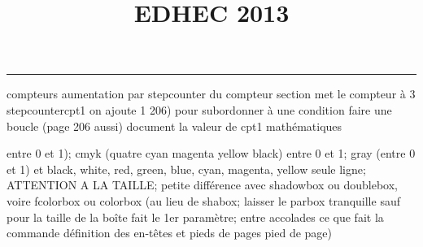 \documentclass[11pt]{article}%
\title{\bf \vspace{-2cm} EDHEC 2013} %
\author{} %
\date{} %
\renewcommand{\headrulewidth}{0pt}%
\renewcommand{\footrulewidth}{0.4pt}%
\begin{document}
\maketitle %
\vspace{-1.4cm}\hrule %
\thispagestyle{fancy}

\vspace*{.2cm}



compteurs%
aumentation par stepcounter du compteur section%
met le compteur à 3%
stepcounter{cpt1} on ajoute 1%
206) pour subordonner à une condition %
faire une boucle (page 206 aussi) %
document la valeur de cpt1 
mathématiques\newcommand{\ch}{\operatorname{ch}} 
\newcommand{\sh}{\operatorname{sh}}
\renewcommand{\tanh}{\operatorname{th}}
\renewcommand{\sinh}{\operatorname{sh}}
\renewcommand{\cosh}{\operatorname{ch}}
\newcommand{\argsh}{\operatorname{argsh}}
\newcommand{\argch}{\operatorname{argch}}
\newcommand{\argth}{\operatorname{argth}}
\newcommand{\Id}{\operatorname{Id}}
\newcommand{\id}{\operatorname{id}}
\renewcommand{\im}{\operatorname{Im}}
\renewcommand{\leq}{\leq}
\renewcommand{\geq}{\geq }

\newcommand{\dlim}{\lim}
\newcommand{\dsum}{\sum\limits}
\newcommand{\dprod}{\prod}
\newcommand{\lb}{\llbracket}
\newcommand{\rb}{\rrbracket}


entre 0 et 1); cmyk (quatre cyan magenta yellow black) entre 0 et 1;
gray (entre 0 et 1) et black, white, red, green, blue, cyan, magenta,
yellow%
seule ligne; ATTENTION A LA TAILLE; petite différence avec shadowbox ou
doublebox, voire fcolorbox ou colorbox (au lieu de shabox; laisser le
parbox tranquille sauf pour la taille de la boîte
\newcommand{\Tbox}[1]{\begin{center} \shabox{\parbox{0.5
\linewidth}{#1}} \end{center}} %
fait le 1er paramètre; entre accolades ce que fait la commande
définition des en-têtes et pieds de pages\pagestyle{fancy}
\chead{}
\rfoot[ \ \thepage]{\thepage}
\cfoot{}
\lfoot{}
\thispagestyle{fancy} %
pied de page)\renewcommand{\footrulewidth}{0.4pt}
\renewcommand{\headrulewidth}{0.4pt}
\end{document}
